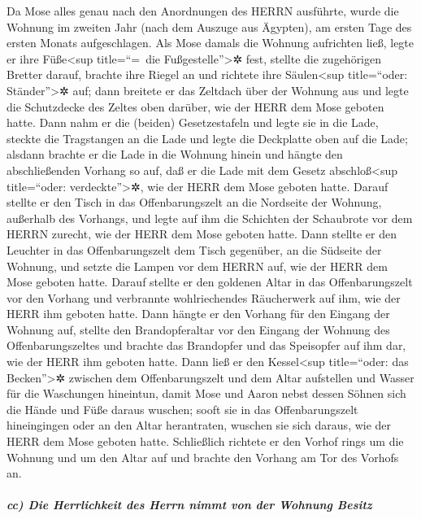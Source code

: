 Da Mose alles genau nach den Anordnungen des HERRN
ausführte,  wurde die Wohnung im zweiten Jahr (nach dem
Auszuge aus Ägypten), am ersten Tage des ersten Monats aufgeschlagen.
 Als Mose damals die Wohnung aufrichten ließ, legte er
ihre Füße\textless sup title=``=~die Fußgestelle''\textgreater✲ fest,
stellte die zugehörigen Bretter darauf, brachte ihre Riegel an und
richtete ihre Säulen\textless sup title=``oder: Ständer''\textgreater✲
auf;  dann breitete er das Zeltdach über der Wohnung aus
und legte die Schutzdecke des Zeltes oben darüber, wie der HERR dem Mose
geboten hatte.  Dann nahm er die (beiden) Gesetzestafeln
und legte sie in die Lade, steckte die Tragstangen an die Lade und legte
die Deckplatte oben auf die Lade;  alsdann brachte er die
Lade in die Wohnung hinein und hängte den abschließenden Vorhang so auf,
daß er die Lade mit dem Gesetz abschloß\textless sup title=``oder:
verdeckte''\textgreater✲, wie der HERR dem Mose geboten hatte.
 Darauf stellte er den Tisch in das Offenbarungszelt an
die Nordseite der Wohnung, außerhalb des Vorhangs,  und
legte auf ihm die Schichten der Schaubrote vor dem HERRN zurecht, wie
der HERR dem Mose geboten hatte.  Dann stellte er den
Leuchter in das Offenbarungszelt dem Tisch gegenüber, an die Südseite
der Wohnung,  und setzte die Lampen vor dem HERRN auf,
wie der HERR dem Mose geboten hatte.  Darauf stellte er
den goldenen Altar in das Offenbarungszelt vor den Vorhang
 und verbrannte wohlriechendes Räucherwerk auf ihm, wie
der HERR ihm geboten hatte.  Dann hängte er den Vorhang
für den Eingang der Wohnung auf,  stellte den
Brandopferaltar vor den Eingang der Wohnung des Offenbarungszeltes und
brachte das Brandopfer und das Speisopfer auf ihm dar, wie der HERR ihm
geboten hatte.  Dann ließ er den Kessel\textless sup
title=``oder: das Becken''\textgreater✲ zwischen dem Offenbarungszelt
und dem Altar aufstellen und Wasser für die Waschungen hineintun,
 damit Mose und Aaron nebst dessen Söhnen sich die Hände
und Füße daraus wuschen;  sooft sie in das
Offenbarungszelt hineingingen oder an den Altar herantraten, wuschen sie
sich daraus, wie der HERR dem Mose geboten hatte. 
Schließlich richtete er den Vorhof rings um die Wohnung und um den Altar
auf und brachte den Vorhang am Tor des Vorhofs an.

\hypertarget{cc-die-herrlichkeit-des-herrn-nimmt-von-der-wohnung-besitz}{%
\subparagraph{cc) Die Herrlichkeit des Herrn nimmt von der Wohnung
Besitz}\label{cc-die-herrlichkeit-des-herrn-nimmt-von-der-wohnung-besitz}}

